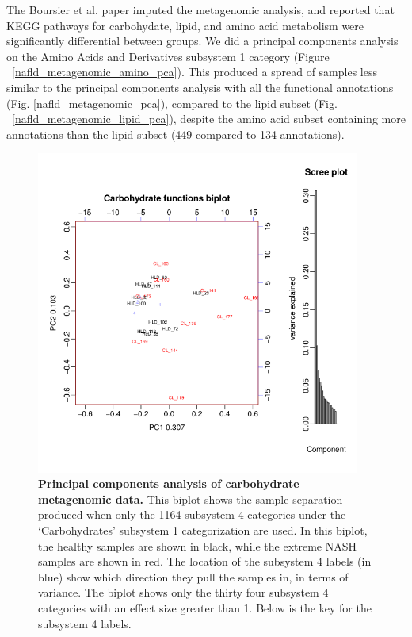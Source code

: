 The Boursier et al. \cite{boursier2016severity} paper imputed the metagenomic analysis, and reported that KEGG pathways for carbohydate, lipid, and amino acid metabolism were significantly differential between groups. We did a principal components analysis on the Amino Acids and Derivatives subsystem 1 category (Figure ~\ref{nafld_metagenomic_amino_pca}). This produced a spread of samples less similar to the principal components analysis with all the functional annotations (Fig. \ref{nafld_metagenomic_pca}), compared to the lipid subset (Fig. ~\ref{nafld_metagenomic_lipid_pca}), despite the amino acid subset containing more annotations than the lipid subset (449 compared to 134 annotations).

\begin{figure}[h]
\begin{center}
\includegraphics[width=0.95\textwidth]{metagenomic_carb_pca.png}
\caption[Principal components analysis of carbohydrate metagenomic data.]{\textbf{Principal components analysis of carbohydrate metagenomic data.} This biplot shows the sample separation produced when only the 1164 subsystem 4 categories under the `Carbohydrates' subsystem 1 categorization are used. In this biplot, the healthy samples are shown in black, while the extreme NASH samples are shown in red. The location of the subsystem 4 labels (in blue) show which direction they pull the samples in, in terms of variance. The biplot shows only the thirty four subsystem 4 categories with an effect size greater than 1. Below is the key for the subsystem 4 labels.
}
\end{center}
\end{figure}
